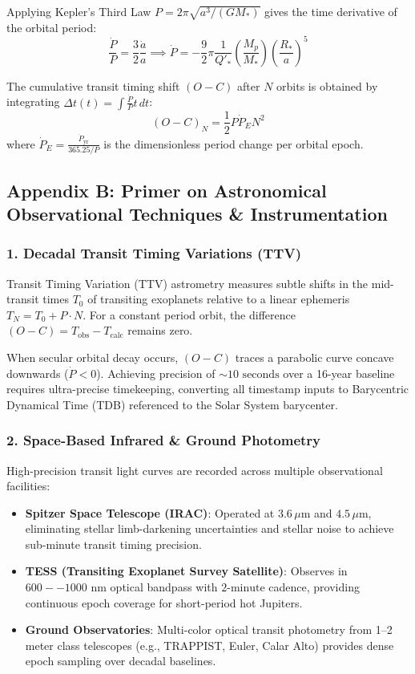 \documentclass[11pt,a4paper]{article}
\begin{document}
Applying Kepler's Third Law $P = 2\pi \sqrt{a^3 / (G M_*)}$ gives the time derivative of the orbital period:
\begin{equation}
\frac{\dot{P}}{P} = \frac{3}{2} \frac{\dot{a}}{a} \implies \dot{P} = -\frac{9}{2} \pi \frac{1}{Q'_*} \left(\frac{M_p}{M_*}\right) \left(\frac{R_*}{a}\right)^5
\end{equation}

The cumulative transit timing shift $(O - C)$ after $N$ orbits is obtained by integrating $\Delta t(t) = \int \frac{\dot{P}}{P} t \, dt$:
\begin{equation}
(O - C)_N = \frac{1}{2} P \dot{P}_E N^2
\end{equation}
where $\dot{P}_E = \frac{\dot{P}_{\text{yr}}}{365.25 / P}$ is the dimensionless period change per orbital epoch.

\subsection*{Appendix B: Primer on Astronomical Observational Techniques \& Instrumentation}

\subsubsection*{1. Decadal Transit Timing Variations (TTV)}
Transit Timing Variation (TTV) astrometry measures subtle shifts in the mid-transit times $T_0$ of transiting exoplanets relative to a linear ephemeris $T_N = T_0 + P \cdot N$. For a constant period orbit, the difference $(O - C) = T_{\text{obs}} - T_{\text{calc}}$ remains zero. 

When secular orbital decay occurs, $(O - C)$ traces a parabolic curve concave downwards ($\dot{P} < 0$). Achieving precision of $\sim 10\text{ seconds}$ over a 16-year baseline requires ultra-precise timekeeping, converting all timestamp inputs to Barycentric Dynamical Time (TDB) referenced to the Solar System barycenter.

\subsubsection*{2. Space-Based Infrared \& Ground Photometry}
High-precision transit light curves are recorded across multiple observational facilities:
\begin{itemize}
    \item \textbf{Spitzer Space Telescope (IRAC)}: Operated at $3.6\,\mu\text{m}$ and $4.5\,\mu\text{m}$, eliminating stellar limb-darkening uncertainties and stellar noise to achieve sub-minute transit timing precision.
    \item \textbf{TESS (Transiting Exoplanet Survey Satellite)}: Observes in $600--1000\text{ nm}$ optical bandpass with $2\text{-minute}$ cadence, providing continuous epoch coverage for short-period hot Jupiters.
    \item \textbf{Ground Observatories}: Multi-color optical transit photometry from 1--2 meter class telescopes (e.g., TRAPPIST, Euler, Calar Alto) provides dense epoch sampling over decadal baselines.
\end{itemize}
\end{document}
